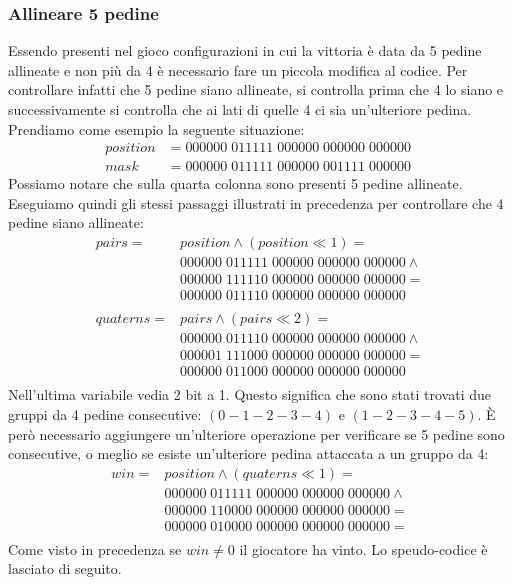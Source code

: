 \documentclass[a4paper]{article}
\begin{document}
\subsubsection{Allineare 5 pedine}
Essendo presenti nel gioco configurazioni in cui la vittoria è data da 5 pedine
allineate e non più da 4 è necessario fare un piccola modifica al codice. Per 
controllare infatti che 5 pedine siano allineate, si controlla prima che 4 lo 
siano e successivamente si controlla che ai lati di quelle 4 ci sia un'ulteriore
pedina. Prendiamo come esempio la seguente situazione:
\begin{align*}
  position &= 000000\; 011111\; 000000\; 000000\; 000000\\
  mask &= 000000\; 011111\; 000000\; 001111\; 000000\;
\end{align*}
Possiamo notare che sulla quarta colonna sono presenti 5 pedine allineate. 
Eseguiamo quindi gli stessi passaggi illustrati in precedenza per controllare 
che 4 pedine siano allineate:
\begin{align*}
  pairs = &position \land (position \ll 1) =\\
  &000000\; 011111\; 000000\; 000000\; 000000 \land \\
  &000000\; 111110\; 000000\; 000000\; 000000 = \\
  &000000\; 011110\; 000000\; 000000\; 000000\\
  \\
  quaterns = &pairs \land (pairs \ll 2) =\\
  &000000\; 011110\; 000000\; 000000\; 000000 \land \\
  &000001\; 111000\; 000000\; 000000\; 000000 = \\
  &000000\; 011000\; 000000\; 000000\; 000000\\
\end{align*}
Nell'ultima variabile vedia 2 bit a 1. Questo significa che sono stati trovati
due gruppi da 4 pedine consecutive: $(0-1-2-3-4)$ e $(1-2-3-4-5)$. È però 
necessario aggiungere un'ulteriore operazione per verificare se 5 pedine sono
consecutive, o meglio se esiste un'ulteriore pedina attaccata a un gruppo da 4:
\begin{align*}
  win = &position \land (quaterns \ll 1) =\\
  &000000\; 011111\; 000000\; 000000\; 000000 \land \\
  &000000\; 110000\; 000000\; 000000\; 000000 = \\
  &000000\; 010000\; 000000\; 000000\; 000000 = \\
\end{align*}
Come visto in precedenza se $win \neq 0$ il giocatore ha vinto. Lo speudo-codice
è lasciato di seguito.
\end{document}

